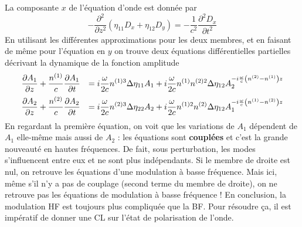 La composante $x$ de l'équation d'onde est donnée par
\begin{equation}
-\dfrac{\partial^2}{\partial z^2}(\eta_{11}D_x+\eta_{12}D_y)=-\frac{1}{c^2}\dfrac{\partial^2D_x}{\partial t^2}
\end{equation}
En utilisant les différentes approximations pour les deux membres, et en faisant de même pour l'équation en $y$
on trouve deux équations différentielles partielles décrivant la dynamique de la fonction amplitude
\begin{equation}
\begin{array}{ll}
\DS\dfrac{\partial A_1}{\partial z}+\dfrac{n^{(1)}}{c}\dfrac{\partial A_1}{\partial t} &=\DS i\dfrac{\omega}{2c}
n^{(1)3}\Delta\eta_{11}A_1+i\dfrac{\omega}{2c}n^{(1)}n^{(2)2}\Delta\eta_{12}A_2^{-i\frac{\omega}{c}\left(
n^{(2)}-n^{(1)}\right)z}\vspace{2mm}\\
\DS\dfrac{\partial A_2}{\partial z}+\dfrac{n^{(2)}}{c}\dfrac{\partial A_2}{\partial t} &=\DS i\dfrac{\omega}{2c}
n^{(2)3}\Delta\eta_{22}A_2+i\dfrac{\omega}{2c}n^{(1)2}n^{(2)}\Delta\eta_{12}A_1^{-i\frac{\omega}{c}\left(
n^{(1)}-n^{(2)}\right)z}
\end{array}
\label{eq:6.59}
\end{equation}
En regardant la première équation, on voit que les variations de $A_1$ dépendent de $A_1$ elle-même mais aussi
de $A_2$ : les équations sont \textbf{couplées} et c'est la grande nouveauté en hautes fréquences. De fait, sous
perturbation, les modes s’influencent entre eux et ne sont plus indépendants. Si le membre de droite est nul, on
retrouve les équations d'une modulation à basse fréquence. Mais ici, même s'il n'y a pas de couplage (second terme 
du membre de droite), on ne retrouve pas les équations de modulation à basse fréquence ! En conclusion, la modulation
HF est toujours plus compliquée que la BF. Pour résoudre ça, il est impératif de donner une CL sur l'état de 
polarisation de l'onde. 



